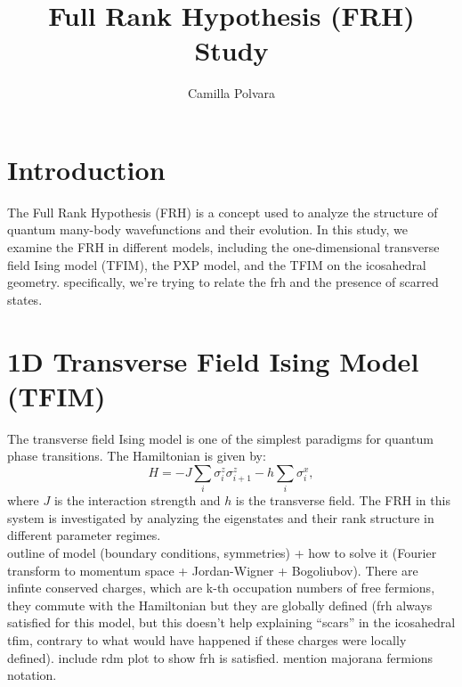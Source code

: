 \documentclass{article}
\title{Full Rank Hypothesis (FRH) Study}
\author{Camilla Polvara}
\date{}
\begin{document}
\maketitle

\section{Introduction}
The Full Rank Hypothesis (FRH) is a concept used to analyze the structure of quantum many-body wavefunctions and their evolution. In this study, we examine the FRH in different models, including the one-dimensional transverse field Ising model (TFIM), the PXP model, and the TFIM on the icosahedral geometry. specifically, we're trying to relate the frh and the presence of scarred states.

\section{1D Transverse Field Ising Model (TFIM)}
The transverse field Ising model is one of the simplest paradigms for quantum phase transitions. The Hamiltonian is given by:
\begin{equation}
    H = -J \sum_{i} \sigma^z_i \sigma^z_{i+1} - h \sum_{i} \sigma^x_i,
\end{equation}
where $J$ is the interaction strength and $h$ is the transverse field. The FRH in this system is investigated by analyzing the eigenstates and their rank structure in different parameter regimes.\\
outline of model (boundary conditions, symmetries) + how to solve it (Fourier transform to momentum space + Jordan-Wigner + Bogoliubov). There are infinte conserved charges, which are k-th occupation numbers of free fermions, they commute with the Hamiltonian but they are globally defined (frh always satisfied for this model, but this doesn't help explaining ``scars'' in the icosahedral tfim, contrary to what would have happened if these charges were locally defined). include rdm plot to show frh is satisfied. mention majorana fermions notation.
\end{document}

